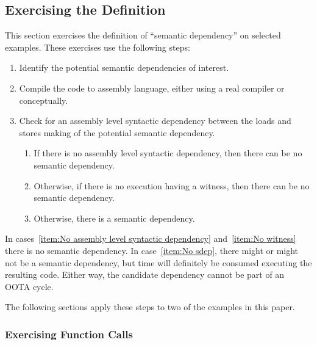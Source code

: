 \subsection{Exercising the Definition}
\label{sec:Exercising the Definition}

This section exercises the definition of ``semantic dependency'' on
selected examples.
These exercises use the following steps:

\begin{enumerate}
\item	Identify the potential semantic dependencies of interest.
\item	Compile the code to assembly language, either using a
	real compiler or conceptually.
\item	Check for an assembly level syntactic dependency between
	the loads and stores making of the potential semantic
	dependency.
	\begin{enumerate}
	\item	If there is no assembly level syntactic dependency,
		then there can be no semantic
		dependency.\label{item:No assembly level syntactic dependency}
	\item	Otherwise, if there is no execution having a witness,
		then there can be no semantic
		dependency.\label{item:No witness}
	\item	Otherwise, there is a semantic
		dependency.\label{item:No sdep}
	\end{enumerate}
\end{enumerate}

In cases~\ref{item:No assembly level syntactic dependency}
and~\ref{item:No witness}
there is no semantic dependency.
In case~\ref{item:No sdep},
there might or might not be a semantic dependency, but
time will definitely be consumed executing the resulting code.
Either way, the candidate dependency cannot be part of an OOTA
cycle.

The following sections apply these steps to two of the examples in
this paper.

\subsubsection{Exercising Function Calls}
\label{sec:Exercising Function Calls}

